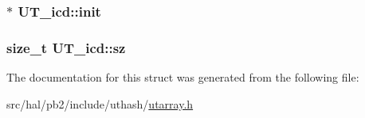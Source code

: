 \subsubsection[{\texorpdfstring{init}{init}}]{$\ast$ U\+T\+\_\+icd\+::init}\hypertarget{struct_u_t__icd_a4efb7d75484d26a649038a991329cfd1}{}\label{struct_u_t__icd_a4efb7d75484d26a649038a991329cfd1}
\subsubsection[{\texorpdfstring{sz}{sz}}]{\setlength{\rightskip}{0pt plus 5cm}size\+\_\+t U\+T\+\_\+icd\+::sz}\hypertarget{struct_u_t__icd_a7021fa86e4197995817c9682140c2c82}{}\label{struct_u_t__icd_a7021fa86e4197995817c9682140c2c82}


The documentation for this struct was generated from the following file\+:\begin{DoxyCompactItemize}
\item 
src/hal/pb2/include/uthash/\hyperlink{utarray_8h}{utarray.\+h}\end{DoxyCompactItemize}
